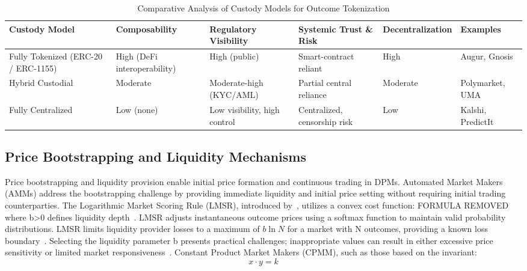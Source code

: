 {\begin{table}[htbp]
    \centering
     \caption{Comparative Analysis of Custody Models for Outcome Tokenization}
     \begin{tabular}{
         |p{2.7cm}|
         >{\centering\arraybackslash}p{2.5cm}|
         >{\centering\arraybackslash}p{2.8cm}|
         >{\centering\arraybackslash}p{3cm}|
         >{\centering\arraybackslash}p{2cm}|
         >{\centering\arraybackslash}p{2.5cm}|
     }
          \hline \textbf{Custody Model} & \textbf{Composability} & \textbf{Regulatory Visibility} & \textbf{Systemic Trust \& Risk} & \textbf{Decentralization} & \textbf{Examples} \\
          \hline Fully Tokenized (ERC-20 / ERC-1155) & High (DeFi interoperability) & High (public) & Smart-contract reliant & High & Augur, Gnosis \\
          \hline Hybrid Custodial & Moderate & Moderate-high (KYC/AML) & Partial central reliance & Moderate & Polymarket, UMA \\
          \hline Fully Centralized & Low (none) & Low visibility, high control & Centralized, censorship risk & Low & Kalshi, PredictIt \\
          \hline
     \end{tabular}
     \label{tab:market_mechcanics}
\end{table}

\subsection{Price Bootstrapping and Liquidity Mechanisms}\label{subsec:price_bootstrapping}
Price bootstrapping and liquidity provision enable initial price formation and continuous trading in DPMs. Automated Market Makers (AMMs) address the bootstrapping challenge by providing immediate liquidity and initial price setting without requiring initial trading counterparties.
The Logarithmic Market Scoring Rule (LMSR), introduced by~\cite{Ha03}, utilizes a convex cost function:
FORMULA REMOVED
	where b>0 defines liquidity depth~\cite{OPRS13}.
LMSR adjusts instantaneous outcome prices using a softmax function to maintain valid probability distributions. LMSR limits liquidity provider losses to a maximum of \( b \ln{N} \) for a market with N outcomes, providing a known loss boundary~\cite{CP10}.
Selecting the liquidity parameter b presents practical challenges; inappropriate values can result in either excessive price sensitivity or limited market responsiveness~\cite{Ha03}.
Constant Product Market Makers (CPMM), such as those based on the invariant:
\[x \cdot y = k\]

}
